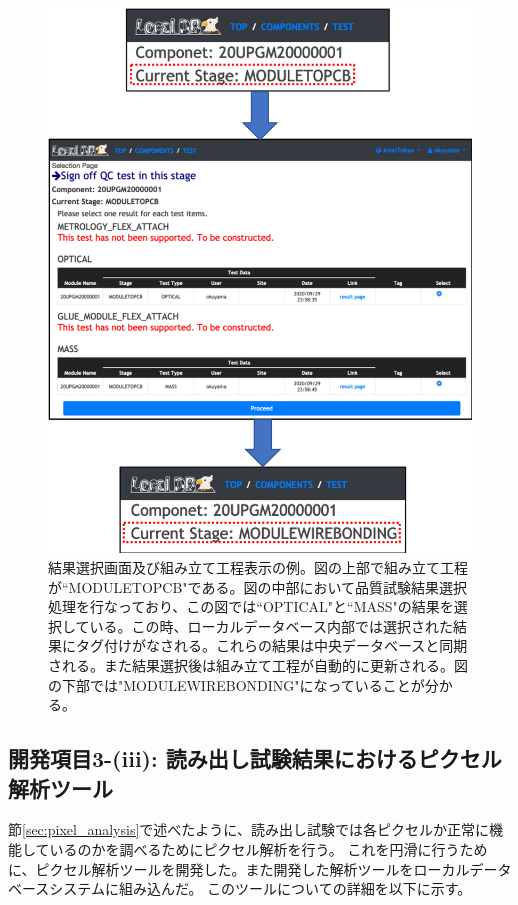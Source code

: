 \begin{figure}[bpt]\centering
\includegraphics[width=14cm]{./webapp_sign_off.png}
\caption[結果選択画面及び組み立て工程表示の例]{結果選択画面及び組み立て工程表示の例。図の上部で組み立て工程が``MODULETOPCB"である。図の中部において品質試験結果選択処理を行なっており、この図では``OPTICAL"と``MASS"の結果を選択している。この時、ローカルデータベース内部では選択された結果にタグ付けがなされる。これらの結果は中央データベースと同期される。また結果選択後は組み立て工程が自動的に更新される。図の下部では"MODULEWIREBONDING"になっていることが分かる。}
\label{webapp_sign_off}
\end{figure}

\clearpage

\newpage
\subsection{開発項目3-(iii): 読み出し試験結果におけるピクセル解析ツール}\label{sec:analysis_tool}
節\ref{sec:pixel_analysis}で述べたように、読み出し試験では各ピクセルか正常に機能しているのかを調べるためにピクセル解析を行う。
これを円滑に行うために、ピクセル解析ツールを開発した。また開発した解析ツールをローカルデータベースシステムに組み込んだ。
このツールについての詳細を以下に示す。

